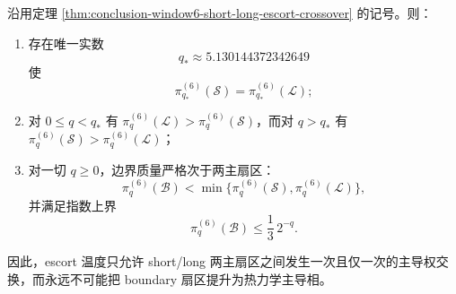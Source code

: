 \begin{corollary}\label{cor:conclusion-window6-escort-unique-crossover-boundary-subdominance}
沿用定理 \ref{thm:conclusion-window6-short-long-escort-crossover} 的记号。则：
\begin{enumerate}
  \item 存在唯一实数
  \[
  q_\ast\approx 5.130144372342649
  \]
  使
  \[
  \pi_{q_\ast}^{(6)}(\mathcal S)=\pi_{q_\ast}^{(6)}(\mathcal L);
  \]
  \item 对 \(0\le q<q_\ast\) 有 \(\pi_q^{(6)}(\mathcal L)>\pi_q^{(6)}(\mathcal S)\)，而对 \(q>q_\ast\) 有 \(\pi_q^{(6)}(\mathcal S)>\pi_q^{(6)}(\mathcal L)\)；
  \item 对一切 \(q\ge 0\)，边界质量严格次于两主扇区：
  \[
  \pi_q^{(6)}(\mathcal B)<\min\{\pi_q^{(6)}(\mathcal S),\pi_q^{(6)}(\mathcal L)\},
  \]
  并满足指数上界
  \[
  \pi_q^{(6)}(\mathcal B)\le \frac13\,2^{-q}.
  \]
\end{enumerate}
因此，escort 温度只允许 short/long 两主扇区之间发生一次且仅一次的主导权交换，而永远不可能把 boundary 扇区提升为热力学主导相。
\end{corollary}

